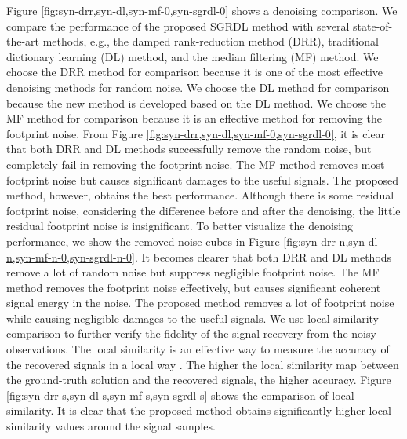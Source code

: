Figure \ref{fig:syn-drr,syn-dl,syn-mf-0,syn-sgrdl-0} shows a denoising comparison. We compare the performance of the proposed SGRDL method with several state-of-the-art methods, e.g., the damped rank-reduction method (DRR), traditional dictionary learning (DL) method, and the median filtering (MF) method. We choose the DRR method for comparison because it is one of the most effective denoising methods for random noise. We choose the DL method for comparison because the new method is developed based on the DL method. We choose the MF method for comparison because it is an effective method for removing the footprint noise. From Figure \ref{fig:syn-drr,syn-dl,syn-mf-0,syn-sgrdl-0}, it is clear that both DRR and DL methods successfully remove the random noise, but completely fail in removing the footprint noise. The MF method removes most footprint noise but causes significant damages to the useful signals. The proposed method, however, obtains the best performance. Although there is some residual footprint noise, considering the difference before and after the denoising, the little residual footprint noise is insignificant. To better visualize the denoising performance, we show the removed noise cubes in Figure \ref{fig:syn-drr-n,syn-dl-n,syn-mf-n-0,syn-sgrdl-n-0}. It becomes clearer that both DRR and DL methods remove a lot of random noise but suppress negligible footprint noise. The MF method removes the footprint noise effectively, but causes significant coherent signal energy in the noise. The proposed method removes a lot of footprint noise while causing negligible damages to the useful signals. We use local similarity comparison to further verify the fidelity of the signal recovery from the noisy observations. The local similarity is an effective way to measure the accuracy of the recovered signals in a local way \cite{yangkang2015ortho}. The higher the local similarity map between the ground-truth solution and the recovered signals, the higher accuracy.  Figure \ref{fig:syn-drr-s,syn-dl-s,syn-mf-s,syn-sgrdl-s} shows the comparison of local similarity. It is clear that the proposed method obtains significantly higher local similarity values around the signal samples. 

